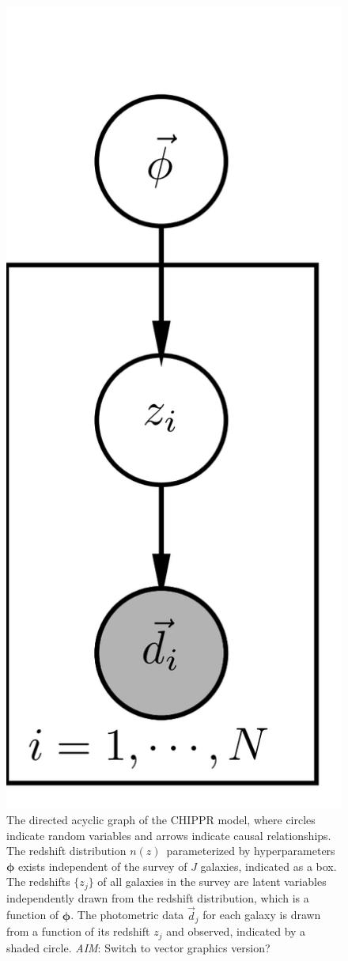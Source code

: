 \documentclass[iop]{emulateapj}
\newcommand{\todo}[3]{{\color{#2}\emph{#1}: #3}}
\newcommand{\aim}[1]{\todo{AIM}{red}{#1}}
\newcommand{\data}{\ensuremath{\vec{d}}}%
\newcommand{\nz}{$n(z)$}
\newcommand{\bvec}[1]{\ensuremath{\boldsymbol{#1}}}%
\newcommand{\ndphi}{\bvec{\phi}}
\begin{document}
\begin{figure}
	\begin{center}
		\includegraphics[height=0.25\textheight]{figures/chippr/pgm.png}
		\caption{The directed acyclic graph of the CHIPPR model, where circles indicate random variables and arrows indicate causal relationships.
			The redshift distribution \nz\ parameterized by hyperparameters $\ndphi$ exists independent of the survey of $J$ galaxies, indicated as a box.  
			The redshifts $\{z_{j}\}$ of all galaxies in the survey are latent variables independently drawn from the redshift distribution, which is a function of $\ndphi$. 
			The photometric data $\data_{j}$ for each galaxy is drawn from a function of its redshift $z_{j}$ and observed, indicated by a shaded circle.
			\aim{Switch to vector graphics version?}}
		\label{fig:pgm}
	\end{center}
\end{figure}
\end{document}
